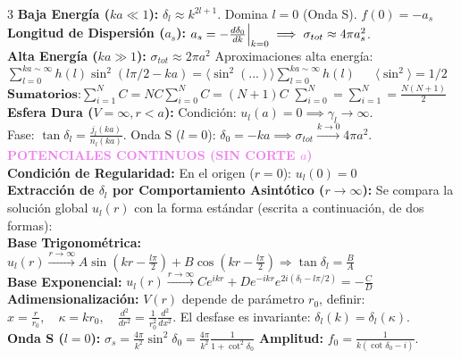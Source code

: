 \documentclass[8pt,a4paper,fleqn]{extarticle} %
\begin{document}
\begin{multicols}{3}
     \textbf{Baja Energía ($ka \ll 1$):} $\delta_l \approx k^{2l+1}$. Domina $l=0$ (Onda S). $f(0)= -a_s$
    \\ \textbf{Longitud de Dispersión ($a_s$):} $a_s = - \frac{d\delta_0}{dk}\Big{|}_{k=0} \implies \sigma_{tot} \approx 4\pi a_s^2$.
    \\ \textbf{Alta Energía ($ka \gg 1$):} $\sigma_{tot} \approx 2\pi a^2$ \;Aproximaciones alta energía:\\ $\sum_{l=0}^{ka \sim \infty} h(l)\sin^2{(l\pi/2 - ka)}= \langle \sin^2 (...) \rangle\sum_{l=0}^{ka \sim \infty} h(l)\;\;\;\;\,\; \langle\sin^2\rangle=1/2$\\
    $\textbf{Sumatorios:} \sum_{i=1}^N C = NC$\qquad $\sum_{i=0}^N C = (N+1)C$ \qquad   $\sum_{i=0}^N = \sum_{i=1}^N = \frac{N(N+1)}{2}$
    \\\textbf{Esfera Dura ($V=\infty, r<a$):} Condición: $u_l(a) = 0 \implies \gamma_l \to \infty$.
        \\ Fase: $\tan \delta_l = \frac{j_l(ka)}{n_l(ka)}$.  Onda S ($l=0$): $\delta_0 = -ka \implies \sigma_{tot} \xrightarrow{k\to 0} 4\pi a^2$.\\
\textcolor{violet}{\textbf{POTENCIALES CONTINUOS (SIN CORTE $a$)}}\\
\textbf{Condición de Regularidad:} En el origen ($r=0$): $u_l(0) = 0$\\
\textbf{Extracción de $\delta_l$ por Comportamiento Asintótico ($r \to \infty$):}
Se compara la solución global $u_l(r)$ con la forma estándar (escrita a continuación, de dos formas):\\
\textbf{Base Trigonométrica:} $u_l(r) \xrightarrow{r \to \infty} A \sin(kr - \frac{l\pi}{2}) + B \cos(kr - \frac{l\pi}{2}) \Rightarrow \tan \delta_l = \frac{B}{A}$\\
\textbf{Base Exponencial:} $u_l(r) \xrightarrow{r \to \infty} C e^{ikr} + D e^{-ikr} e^{2i(\delta_l - l\pi/2)} = -\frac{C}{D}$\\
\textbf{Adimensionalización:} $V(r)$ depende de parámetro $r_0$, definir: $x = \frac{r}{r_0}, \quad \kappa = k r_0, \quad \frac{d^2}{dr^2} = \frac{1}{r_0^2} \frac{d^2}{dx^2}$. El desfase es invariante: $\delta_l(k) = \delta_l(\kappa)$.\\
\textbf{Onda S ($l=0$):} $\sigma_s = \frac{4\pi}{k^2} \sin^2 \delta_0 = \frac{4\pi}{k^2} \frac{1}{1 + \cot^2 \delta_0}$ \textbf{Amplitud:} $f_0 = \frac{1}{k(\cot \delta_0 - i)}$.




\end{multicols}
\end{document}
